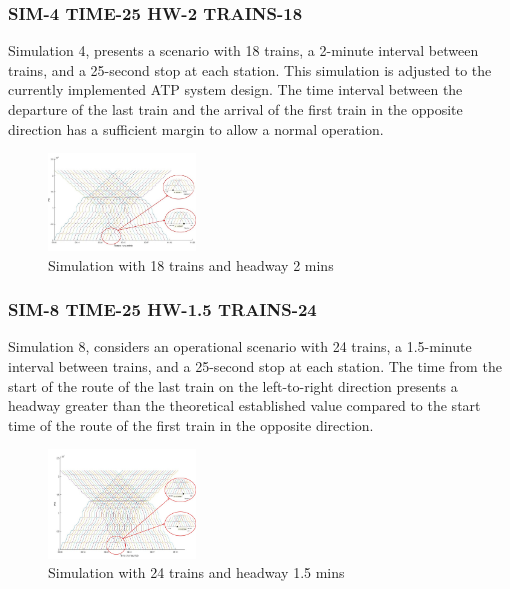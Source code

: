 \documentclass[conference]{IEEEtran}
\begin{document}
\subsubsection{SIM-4 TIME-25 HW-2 TRAINS-18}
Simulation 4, presents a scenario with 18 trains\cite{b20}, a 2-minute interval between trains\cite{b20}, and a 25-second stop at each station\cite{b15}. This simulation is adjusted to the currently implemented ATP system design. The time interval between the departure of the last train and the arrival of the first train in the opposite direction has a sufficient margin to allow a normal operation.\\
\begin{figure}[htbp]
    \centering
    \includegraphics[width=0.35\textwidth,scale=1]{Imagenes_general/SIM-4_TIME-25_HW-2_TRAINS-18.jpg}
    \caption{Simulation with 18 trains and headway 2 mins}
    \label{fig:Simulation 4: 18 Trains / 2 mins headway}
\end{figure}

\subsubsection{SIM-8 TIME-25 HW-1.5 TRAINS-24}
Simulation 8, considers an operational scenario with 24 trains, a 1.5-minute interval between trains, and a 25-second stop at each station\cite{b15}. The time from the start of the route of the last train on the left-to-right direction presents a headway greater than the theoretical established value compared to the start time of the route of the first train in the opposite direction.
\begin{figure}[htbp]
    \centering
    \includegraphics[width=0.35\textwidth,scale=1]{Imagenes_general/SIM-8_TIME-25_HW-1_5_TRAINS-24.jpg}
    \caption{Simulation with 24 trains and headway 1.5 mins}
    \label{fig:Simulation 8: 25 Trains / 1,5 mins headway}
\end{figure}
\end{document}

